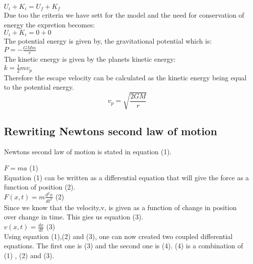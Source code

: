\documentclass{article}
\begin{document}
    $U_i + K_i = U_f + K_f$ \\

    Due too the criteria we have sett for the model and the need for conservation of energy the expretion becomes: \\

    $U_i + K_i = 0 + 0$ \\

    The potential energy is given by, the gravitational potential which is:\\

    $P = - \frac{GMm}{r}$ \\

    The kinetic energy is given by the planets kinetic energy: \\

    $k = \frac{1}{2} mv_p$ \\

    Therefore the escape velocity can be calculated as the kinetic energy being equal to the potential energy. \\

    \begin{equation} \label{eq:escapevelocity}
        v_p =  \sqrt{\frac{2GM}{r}}
    \end{equation}


\subsection{Rewriting Newtons second law of motion} \label{sec:n2l}

    Newtons second law of motion is stated in equation (1).

    $ F = ma $ (1)\\

    Equation (1) can be written as a differential equation that will give the force as a function of position (2).\\

    $F(x,t) = m\frac{d^{2}x}{dt^{2}}$ (2)\\

    Since we know that the velocity,v, is given as a function of change in position over change in time. This gies us equation (3).\\

    $v(x,t) = \frac{dx}{dt}$ (3) \\

    Using equation (1),(2) and (3), one can now created two coupled differential equations. The first one is (3) and the second one is (4). (4) is a combination of (1) , (2) and (3). \\
\end{document}
